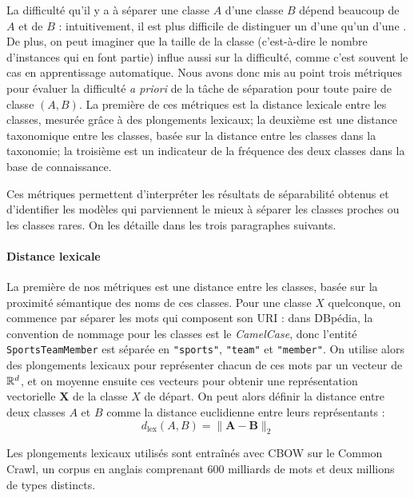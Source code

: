 La difficulté qu'il y a à séparer une classe $A$ d'une classe $B$ dépend beaucoup de $A$ et de $B$ : intuitivement, il est plus difficile de distinguer un  d'une  qu'un  d'une . De plus, on peut imaginer que la taille de la classe (c'est-à-dire le nombre d'instances qui en font partie) influe aussi sur la difficulté, comme c'est souvent le cas en apprentissage automatique. Nous avons donc mis au point trois métriques pour évaluer la difficulté \textit{a priori} de la tâche de séparation pour toute paire de classe $(A, B)$. La première de ces métriques est la distance lexicale entre les classes, mesurée grâce à des plongements lexicaux; la deuxième est une distance taxonomique entre les classes, basée sur la distance entre les classes dans la taxonomie; la troisième est un indicateur de la fréquence des deux classes dans la base de connaissance.

Ces métriques permettent d'interpréter les résultats de séparabilité obtenus et d'identifier les modèles qui parviennent le mieux à séparer les classes proches ou les classes rares. On les détaille dans les trois paragraphes suivants.


\paragraph{Distance lexicale}

La première de nos métriques est une distance entre les classes, basée sur la proximité sémantique des noms de ces classes. Pour une classe $X$ quelconque, on commence par séparer les mots qui composent son URI : dans DBpédia, la convention de nommage pour les classes est le \textit{CamelCase}, donc l'entité \texttt{SportsTeamMember} est séparée en \texttt{"sports"}, \texttt{"team"} et \texttt{"member"}. On utilise alors des plongements lexicaux pour représenter chacun de ces mots par un vecteur de $\mathbb{R}^d$, et on moyenne ensuite ces vecteurs pour obtenir une représentation vectorielle $\mathbf{X}$ de la classe $X$ de départ. On peut alors définir la distance entre deux classes $A$ et $B$ comme la distance euclidienne entre leurs représentants :
\begin{equation}
d_\text{lex}(A, B) = \| \mathbf{A} - \mathbf{B} \|_2
\end{equation}

Les plongements lexicaux utilisés sont entraînés avec CBOW \cite{mikolov2018advances} sur le Common Crawl, un corpus en anglais comprenant 600 milliards de mots et deux millions de types distincts.

